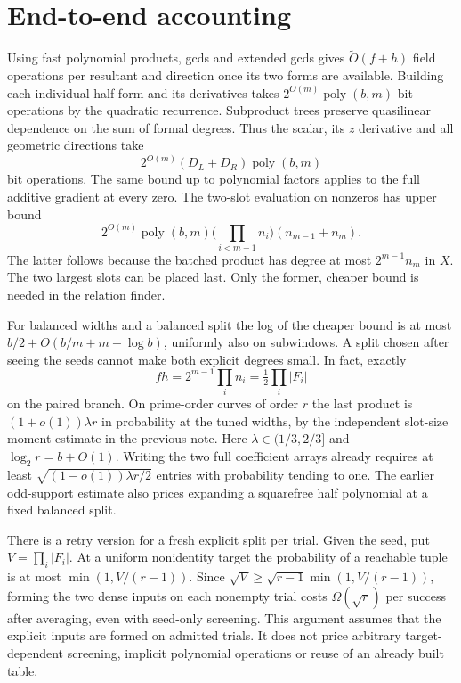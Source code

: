 \documentclass[11pt]{article}
\newcommand{\wtO}{\widetilde O}
\begin{document}
\section{End-to-end accounting}
Using fast polynomial products, gcds and extended gcds gives
$\wtO(f+h)$ field operations per resultant and direction once its
two forms are available. Building each individual half form and
its derivatives takes $2^{O(m)}\operatorname{poly}(b,m)$ bit
operations by the quadratic recurrence. Subproduct trees preserve
quasilinear dependence on the sum of formal degrees. Thus the
scalar, its $z$ derivative and all geometric directions take
\[
  2^{O(m)}(D_L+D_R)\operatorname{poly}(b,m)
\]
bit operations. The same bound up to polynomial factors applies
to the full additive gradient at every zero. The two-slot evaluation
on nonzeros has upper bound
\[
  2^{O(m)}\operatorname{poly}(b,m)
    \Big(\prod_{i<m-1}n_i\Big)(n_{m-1}+n_m).
\]
The latter follows because the batched product has degree at most
$2^{m-1}n_m$ in $X$. The two largest slots can be placed last.
Only the former, cheaper bound is needed in the relation finder.

For balanced widths and a balanced split the log of the cheaper
bound is at most $b/2+O(b/m+m+\log b)$, uniformly also on
subwindows. A split chosen after seeing the seeds cannot make
both explicit degrees small. In fact, exactly
\[
       fh=2^{m-1}\prod_i n_i=\tfrac12\prod_i |F_i|
\]
on the paired branch. On prime-order curves of order $r$ the
last product is $(1+o(1))\lambda r$ in probability at the tuned
widths, by the independent slot-size moment estimate in the
previous note. Here $\lambda\in(1/3,2/3]$ and $\log_2 r=b+O(1)$.
Writing the two full coefficient arrays already requires at least
$\sqrt{(1-o(1))\lambda r/2}$ entries with probability tending to
one. The earlier odd-support estimate also prices expanding a
squarefree half polynomial at a fixed balanced split.

There is a retry version for a fresh explicit split per trial. Given
the seed, put $V=\prod_i |F_i|$. At a uniform nonidentity target
the probability of a reachable tuple is at most
$\min(1,V/(r-1))$. Since
$\sqrt V\ge\sqrt{r-1}\min(1,V/(r-1))$, forming the two dense
inputs on each nonempty trial costs $\Omega(\sqrt r)$ per success
after averaging, even with seed-only screening. This argument
assumes that the explicit inputs are formed on admitted trials.
It does not price arbitrary target-dependent screening, implicit
polynomial operations or reuse of an already built table.
\end{document}
